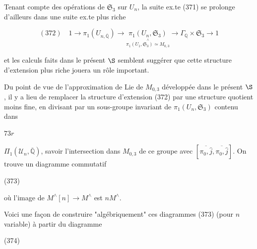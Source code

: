 Tenant compte des opérations de $\mathfrak{S}_3$
sur $U_n$, la suite ex.te (371) se prolonge
d'ailleurs dans une suite ex.te plus
riche

$$(372) \quad 1 \longrightarrow \pi_1(U_{n,\overline{\mathbb{Q}}}) \longrightarrow \underset{\overset{\wedge}{\pi_1(U_1,\mathfrak{S}_3) \simeq M_{0,3}}}{\pi_1(U_n,\mathfrak{S}_3)} \longrightarrow \Gamma_{\mathbb{Q}} \times \mathfrak{S}_3 \longrightarrow 1$$

et les calculs faits dans le présent $\S$ semblent
suggérer que cette structure d'extension plus
riche jouera un rôle important.

Du point de vue de l'approximation
de Lie de $M_{0,3}$ développée dans le présent
$\S$, il y a lieu de remplacer la structure
d'extension (372) par une structure quotient
moins fine, en divisant par un sous-groupe
invariant de $\pi_1(U_n, \mathfrak{S}_3)$ contenu dans

\newpage


$73r$

$\Pi_1(\mathcal{U}_n, \overline{\mathbb{Q}})$, savoir l'intersection dans $M_{0,3}$ de ce
groupe avec $[\overline{\pi_0, \hat{j}}, \overline{\pi_0, \hat{j}}]$. On trouve un
diagramme commutatif

(373)

où l'image de $M^\wedge[n] \to M^\wedge$ est $n M^\wedge$.

Voici une façon de construire "algébriquement"
ces diagrammes (373) (pour $n$ variable)
à partir du diagramme

(374)

